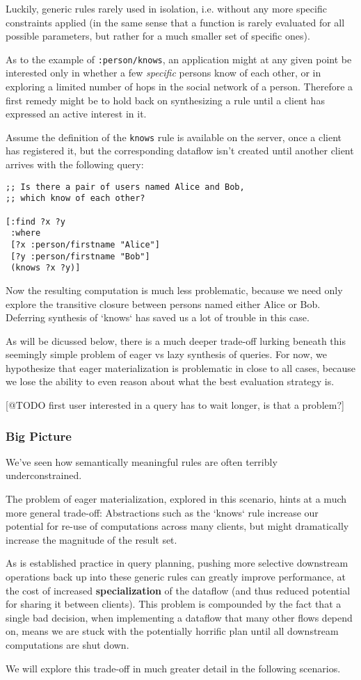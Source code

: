 \documentclass[../catalog.tex]{subfiles}
\begin{document}
Luckily, generic rules rarely used in isolation, i.e. without any more
specific constraints applied (in the same sense that a function is
rarely evaluated for all possible parameters, but rather for a much
smaller set of specific ones).

As to the example of \texttt{:person/knows}, an application might at
any given point be interested only in whether a few \emph{specific}
persons know of each other, or in exploring a limited number of hops
in the social network of a person. Therefore a first remedy might be
to hold back on synthesizing a rule until a client has expressed an
active interest in it.

Assume the definition of the \texttt{knows} rule is available on the
server, once a client has registered it, but the corresponding
dataflow isn't created until another client arrives with the following
query:

\begin{verbatim}
;; Is there a pair of users named Alice and Bob, 
;; which know of each other?

[:find ?x ?y
 :where
 [?x :person/firstname "Alice"]
 [?y :person/firstname "Bob"]
 (knows ?x ?y)]
\end{verbatim}

Now the resulting computation is much less problematic, because we
need only explore the transitive closure between persons named either
Alice or Bob. Deferring synthesis of `knows` has saved us a lot of
trouble in this case.

As will be dicussed below, there is a much deeper trade-off lurking
beneath this seemingly simple problem of eager vs lazy synthesis of
queries. For now, we hypothesize that eager materialization is
problematic in close to all cases, because we lose the ability to even
reason about what the best evaluation strategy is.

[@TODO first user interested in a query has to wait longer, is that a
problem?]

\subsubsection{Big Picture}

We've seen how semantically meaningful rules are often terribly
underconstrained.

The problem of eager materialization, explored in this scenario, hints
at a much more general trade-off: Abstractions such as the `knows`
rule increase our potential for re-use of computations across many
clients, but might dramatically increase the magnitude of the result
set.

As is established practice in query planning, pushing more selective
downstream operations back up into these generic rules can greatly
improve performance, at the cost of increased \textbf{specialization} of the
dataflow (and thus reduced potential for sharing it between
clients). This problem is compounded by the fact that a single bad
decision, when implementing a dataflow that many other flows depend
on, means we are stuck with the potentially horrific plan until all
downstream computations are shut down.

We will explore this trade-off in much greater detail in the following
scenarios.
\end{document}
